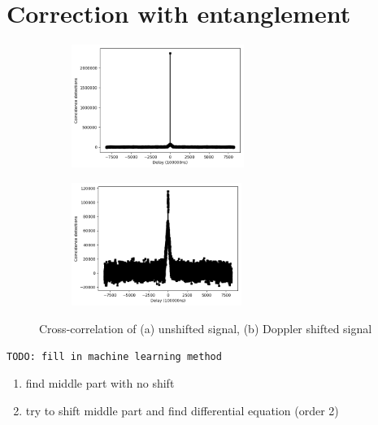 \section{Correction with entanglement}

\begin{figure}[ht!]
	\centering
	\begin{subfigure}[t]{0.49\linewidth}
		\centering
		\includegraphics[height=4cm]{assets/unshifted_cc.png}
		\subcaption{}
	\end{subfigure}
	\begin{subfigure}[t]{0.49\textwidth}
		\centering
		\includegraphics[height=4cm]{assets/doppler_cc.png}
		\subcaption{}
	\end{subfigure}
	\caption{Cross-correlation of (a) unshifted signal, (b) Doppler shifted signal}
	\label{fig:doppler_cc}
\end{figure}


\texttt{TODO: fill in machine learning method}

\begin{enumerate}
	\item find middle part with no shift
	\item try to shift middle part and find differential equation (order 2)
\end{enumerate}
 
